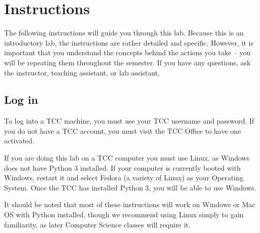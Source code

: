 \documentclass[12pt,hidelinks]{article}
\begin{document}

\pagebreak
\section{Instructions}

The following instructions will guide you through this lab. Because this is an
introductory lab, the instructions are rather detailed and specific. However, it
is important that you understand the concepts behind the actions you take -- you
will be repeating them throughout the semester. If you have any questions, ask
the instructor, teaching assistant, or lab assistant.

\subsection{Log in}
To log into a TCC machine, you must use your TCC username and password. If you
do not have a TCC account, you must visit the TCC Office to have one activated.

If you are doing this lab on a TCC computer you must use Linux, as Windows does
not have Python 3 installed. If your computer is currently booted with Windows,
restart it and select Fedora (a variety of Linux) as your Operating System. Once
the TCC has installed Python 3, you will be able to use Windows.

It should be noted that most of these instructions will work on Windows or Mac
OS with Python installed, though we recommend using Linux simply to gain
familiarity, as later Computer Science classes will require it.
\end{document}
